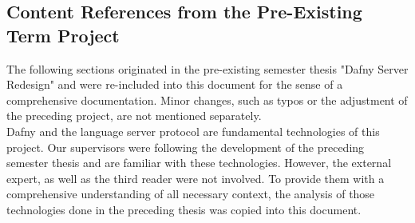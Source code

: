 \subsection{Content References from the Pre-Existing Term Project}
The following sections originated in the pre-existing semester thesis "Dafny Server Redesign"\cite{sa} and were re-included into this document for the sense of a comprehensive documentation.
Minor changes, such as typos or the adjustment of the preceding project, are not mentioned separately.\\

Dafny and the language server protocol are fundamental technologies of this project.
Our supervisors were following the development of the preceding semester thesis and are familiar with these technologies.
However, the external expert, as well as the third reader were not involved.
To provide them with a comprehensive understanding of all necessary context, the analysis of those technologies done in the preceding thesis was copied into this document.




